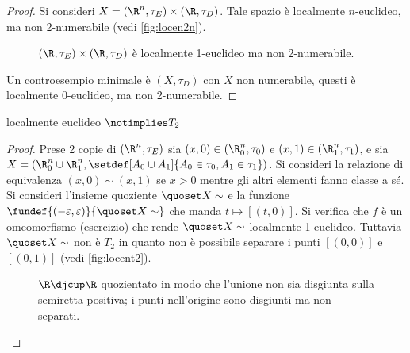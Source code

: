 \begin{proof} 
	Si consideri $X = (\R^n, \tau _E) \times (\R, \tau _D)$.
	Tale spazio è localmente $n$-euclideo, ma non 2-numerabile (vedi \autoref{fig:locen2n}).
	\begin{figure}
		\centering
		
		\caption{$(\R,\tau_E)\times(\R,\tau_D)$ è localmente 1-euclideo ma non 2-numerabile.}
		\label{fig:locen2n}
	\end{figure}
	Un controesempio minimale è $(X, \tau _D)$ con $X$ non numerabile,
	questi è localmente 0-euclideo, ma non 2-numerabile.
\end{proof}

\begin{prop}
	localmente euclideo $\notimplies T_2$
\end{prop}

\begin{proof}
	Prese 2 copie di $(\R^n, \tau_E)$ sia $(x,0) \in (\R^n_0, \tau_0)$ e $(x,1) \in (\R^n_1, \tau_1)$,
	e sia $X = (\R^n_0 \cup \R^n_1, \setdef[A_0\cup A_1]{A_0\in\tau_0,A_1\in\tau_1})$.
	Si consideri la relazione di equivalenza $(x,0)\sim(x,1)$ se $x>0$
	mentre gli altri elementi fanno classe a sé.
	Si consideri l'insieme quoziente $\quoset X\sim$
	e la funzione $\fundef{(-\varepsilon,\varepsilon)}{\quoset X\sim}$
	che manda $t \mapsto [(t,0)]$.
	Si verifica che $f$ è un omeomorfismo (esercizio)
	che rende $\quoset X\sim$ localmente 1-euclideo.
	Tuttavia $\quoset X\sim$ non è $T_2$
	in quanto non è possibile separare i punti $[(0,0)]$ e $[(0,1)]$
	(vedi \autoref{fig:locent2}).
	\begin{figure}
		\centering
		
		\caption{$\R\djcup\R$ quozientato in modo che l'unione non sia disgiunta sulla semiretta positiva;
		i punti nell'origine sono disgiunti ma non separati.}
		\label{fig:locent2}
	\end{figure}
\end{proof}


